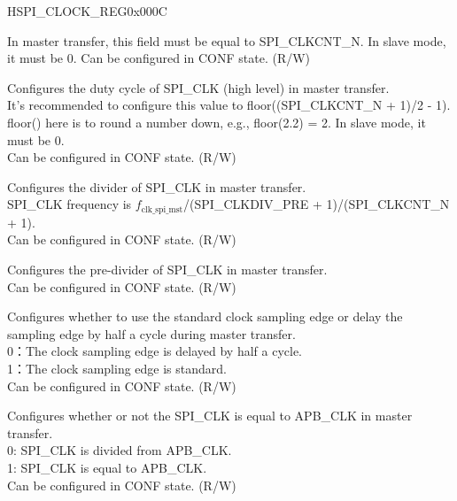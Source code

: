 \begin{register}{H}{SPI\_CLOCK\_REG}{0x000C}\label{regdesc:SPICLOCKREG}
%
%
%
%
%
%
%
\regnewline%
\begin{regdesc}\begin{reglist}
\label{fielddesc:SPICLKCNTL}\item [SPI\_CLKCNT\_L] In master transfer, this field must be equal to SPI\_CLKCNT\_N. In slave mode, it must be 0. Can be configured in CONF state. (R/W)
\label{fielddesc:SPICLKCNTH}\item [SPI\_CLKCNT\_H] Configures the duty cycle of SPI\_CLK (high level) in master transfer. \\
It's recommended to configure this value to floor((SPI\_CLKCNT\_N + 1)/2 - 1). floor() here is to round a number down, e.g., floor(2.2) = 2. In slave mode, it must be 0. \\
Can be configured in CONF state. (R/W)
\label{fielddesc:SPICLKCNTN}\item [SPI\_CLKCNT\_N] Configures the divider of SPI\_CLK in master transfer. \\
SPI\_CLK frequency is $f_{\textrm{clk\_spi\_mst}}$/(SPI\_CLKDIV\_PRE + 1)/(SPI\_CLKCNT\_N + 1). \\
Can be configured in CONF state. (R/W)
\label{fielddesc:SPICLKDIVPRE}\item [SPI\_CLKDIV\_PRE] Configures the pre-divider of SPI\_CLK in master transfer. \\
Can be configured in CONF state. (R/W)
\label{fielddesc:SPICLKEDGESEL}\item [SPI\_CLK\_EDGE\_SEL] Configures whether to use the standard clock sampling edge or delay the sampling edge by half a cycle during master transfer.\\
0：The clock sampling edge is delayed by half a cycle.\\
1：The clock sampling edge is standard.\\
Can be configured in CONF state. (R/W)
\label{fielddesc:SPICLKEQUSYSCLK}\item [SPI\_CLK\_EQU\_SYSCLK] Configures whether or not the SPI\_CLK is equal to APB\_CLK in master transfer. \\
0: SPI\_CLK is divided from APB\_CLK. \\
1: SPI\_CLK is equal to APB\_CLK. \\
Can be configured in CONF state. (R/W)
\end{reglist}\end{regdesc}
\end{register}


